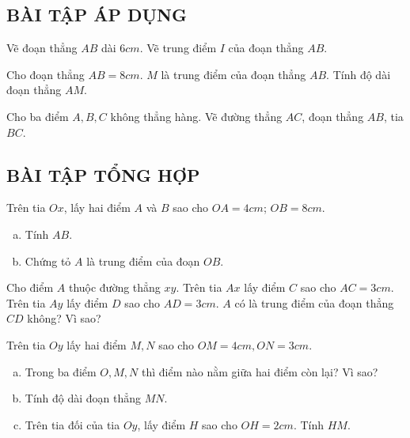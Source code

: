 \subsection{BÀI TẬP ÁP DỤNG}
\begin{bt}
Vẽ đoạn thẳng $AB$ dài $6 cm$. Vẽ trung điểm $I$ của đoạn thẳng $AB.$



\end{bt}   \begin{bt}
Cho đoạn thẳng $AB = 8 cm.$ $M$ là trung điểm của đoạn thẳng $AB.$ Tính độ dài đoạn thẳng $AM.$

\end{bt}   \begin{bt}
Cho ba điểm $A, B, C$ không thẳng hàng. Vẽ đường thẳng $AC$, đoạn thẳng $AB$, tia $BC$.

\subsection{BÀI TẬP TỔNG HỢP}
\end{bt}   \begin{bt}
Trên tia $Ox$, lấy hai điểm $A$ và $B$ sao cho $OA= 4cm$; $OB = 8 cm.$
\begin{enumerate}[a)]
\item Tính $AB$.
\item Chứng tỏ $A$ là trung điểm của đoạn $OB$.
\end{enumerate}

\end{bt}   \begin{bt}
Cho điểm $A$ thuộc đường thẳng $xy$. Trên tia $Ax$ lấy điểm $C$ sao cho $AC = 3 cm.$ Trên tia $Ay$ lấy điểm $D$ sao cho $AD = 3cm.$ $A$ có là trung điểm của đoạn thẳng $CD$ không? Vì sao?

\end{bt}   \begin{bt}
Trên tia $Oy$ lấy hai điểm $M, N$ sao cho $OM = 4 cm, ON = 3 cm.$
\begin{enumerate}[a)]
\item Trong ba điểm $O, M, N$ thì điểm nào nằm giữa hai điểm còn lại? Vì sao?
\item Tính độ dài đoạn thẳng $MN$.
\item Trên tia đối của tia $Oy$, lấy điểm $H$ sao cho $OH = 2 cm$. Tính $HM$.
\end{enumerate}


\end{bt}
